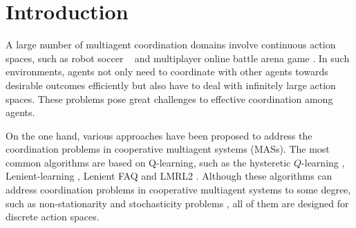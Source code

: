 \documentclass[journal,transmag]{IEEEtran}
\begin{document}
%
\IEEEpeerreviewmaketitle



\section{Introduction}

A large number of multiagent coordination domains involve continuous action spaces, such as robot soccer ~\cite{Riedmiller2009RLR} and multiplayer online battle arena game \cite{MENG2015190Channels}. In such environments, agents not only need to coordinate with other agents towards desirable outcomes efficiently but also have to deal with infinitely large action spaces. These problems pose great challenges to effective coordination among agents.

On the one hand, various approaches have been proposed to address the coordination problems in cooperative multiagent systems (MASs). The most common algorithms are based on Q-learning, such as the hysteretic $Q$-learning \cite{matignon2007}, Lenient-learning \cite{Panait2006Lenient}, Lenient FAQ \cite{Bloembergen2011ETS} and LMRL2 \cite{Wei2016LLI}. Although these algorithms can address coordination problems in cooperative multiagent systems to some degree, such as non-stationarity and stochasticity problems \cite{Matignon2012}, all of them are designed for discrete action spaces.

\end{document}
